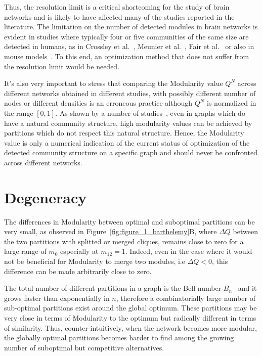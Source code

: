 Thus, the resolution limit is a critical shortcoming for the study of brain networks and is likely to have affected many of the studies reported in the literature. The limitation on the number of detected modules in brain networks is evident in studies where typically four or five communities of the same size are detected in humans, as in Crossley et al.~\cite{crossley2013a}, Meunier et al.~\cite{meunier2009a,meunier2010}, Fair et al.~\cite{fair2009} or also in mouse models~\cite{schwarz2008}. To this end, an optimization method that does not suffer from the resolution limit would be needed.

It's also very important to stress that comparing the Modularity value $Q^N$ across different networks obtained in different studies, with possibly different number of nodes or different densities is an erroneous practice although $Q^N$ is normalized in the range $[0,1]$. As shown by a number of studies~\cite{good2009,kehagias2013,radicchi2010}, even in graphs which do have a natural community structure, high modularity values can be achieved by partitions which do not respect this natural structure. Hence, the Modularity value is only a numerical indication of the current status of optimization of the detected community structure on a specific graph and should never be confronted across different networks.


\section{Degeneracy}\label{sec:degeneracy}
The differences in Modularity between optimal and suboptimal partitions can be very small, as observed in Figure~\ref{fig:figure_1_barthelemy}B, where $\Delta Q$ between the two partitions with splitted or merged cliques, remains close to zero for a large range of $m_0$ especially at $m_{12}=1$.
Indeed, even in the case where it would not be beneficial for Modularity to merge two modules, i.e $\Delta Q <0$, this difference can be made arbitrarily close to zero.

The total number of different partitions in a graph is the Bell number $B_n$~\cite{stanley1997} and it grows faster than exponentially in $n$, therefore a combinatorially large number of sub-optimal partitions exist around the global optimum. These partitions may be very close in terms of Modularity to the optimum but radically different in terms of similarity.
Thus, counter-intuitively, when the network becomes more modular, the globally optimal partitions becomes harder to find among the growing number of suboptimal but competitive alternatives.

